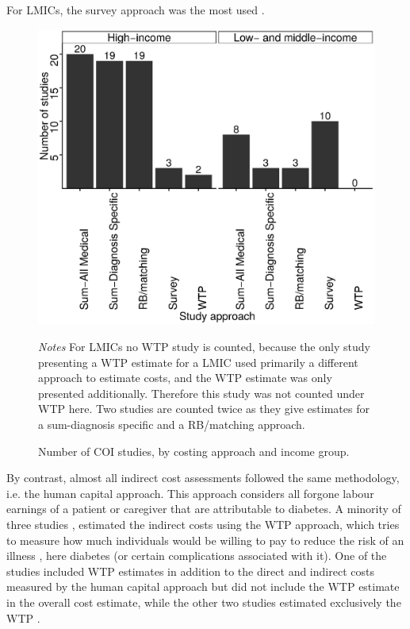 For \acp{LMIC}, the survey approach was the most used \parencite{Wang2009b,Wang2009f,Chan2007a,Ramachandran2007d,Javanbakht2011b,Khowaja2007a,Biorac2009a,Elrayah-Eliadarous2010b,Chatterjee2011c,Al-Maskari2010c,Druss2001,Tharkar2010a,Wang2010c}.


\begin{figure}[p]
\caption{\label{fig:review_COI_number}Number of \acs*{COI} studies, by costing approach and income group.}%

\begin{minipage}{\linewidth}
\begin{center}
\includegraphics[width=0.8\linewidth]{Review/Figures/Fig2.eps}\\
\end{center}
\footnotesize \textit{Notes} For \acp{LMIC} no \ac{WTP} study is counted, because the only study \parencite{Tharkar2010a} presenting a \ac{WTP} estimate for a \ac{LMIC} used primarily a different approach to estimate costs, and the \ac{WTP} estimate was only presented additionally. Therefore this study was not counted under \ac{WTP} here. Two studies are counted twice as they give estimates for a sum-diagnosis specific and a RB/matching approach.
\end{minipage}
\end{figure}

By contrast, almost all indirect cost assessments followed the same methodology, i.e. the human capital approach. This approach considers all forgone labour earnings of a patient or caregiver that are attributable to diabetes. A minority of three studies \parencite{Tharkar2010a,Chang2010b,Gyldmark2001}, estimated the indirect costs using the \ac{WTP} approach, which tries to measure how much individuals would be willing to pay to reduce the risk of an illness \parencite{Segel2006}, here diabetes (or certain complications associated with it). One of the studies included \ac{WTP} estimates in addition to the direct and indirect costs measured by the human capital approach \parencite{Tharkar2010a} but did not include the \ac{WTP} estimate in the overall cost estimate, while the other two studies estimated exclusively the \ac{WTP} \parencite{Chang2010b,Gyldmark2001}.


